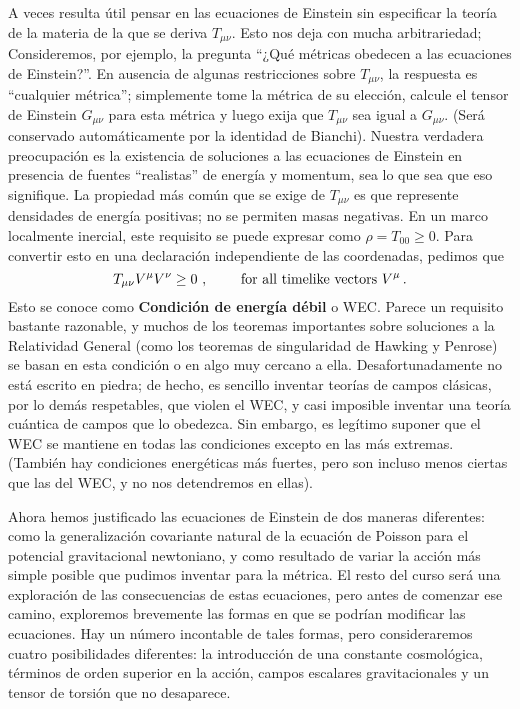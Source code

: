 \documentclass[11pt,b5paper,openany,twoside]{book}
\newcommand{\mn}{{\mu\nu}}
\begin{document}
A veces resulta útil pensar en las ecuaciones de Einstein sin especificar la teoría de la materia de la que se deriva $T_\mn$.
Esto nos deja con mucha arbitrariedad; Consideremos, por ejemplo, la pregunta ``¿Qué métricas obedecen a las ecuaciones de Einstein?''. En ausencia de algunas restricciones sobre $T_\mn$, la respuesta es ``cualquier métrica''; simplemente tome la métrica de su elección, calcule el tensor de Einstein $G_\mn$ para esta métrica y luego exija que $T_\mn$ sea igual a $G_\mn$.
(Será conservado automáticamente por la identidad de Bianchi).
Nuestra verdadera preocupación es la existencia de soluciones a las ecuaciones de Einstein en presencia de fuentes ``realistas'' de energía y momentum, sea lo que sea que eso signifique.
La propiedad más común que se exige de $T_\mn$ es que represente densidades de energía positivas; no se permiten masas negativas.
En un marco localmente inercial, este requisito se puede expresar como $\rho = T_{00} \geq 0$.
Para convertir esto en una declaración independiente de las coordenadas, pedimos que
\begin{equation}
T_\mn V^\mu V^\nu \geq 0\ ,\qquad{\rm ~for~all~timelike~vectors~}
V^\mu\,.\label{4.72}
\end{equation}
Esto se conoce como {\bf Condición de energía débil} o WEC.
Parece un requisito bastante razonable, y muchos de los teoremas importantes sobre soluciones a la Relatividad General (como los teoremas de singularidad de Hawking y Penrose) se basan en esta condición o en algo muy cercano a ella.
Desafortunadamente no está escrito en piedra; de hecho, es sencillo inventar teorías de campos clásicas, por lo demás respetables, que violen el WEC, y casi imposible inventar una teoría cuántica de campos que lo obedezca.
Sin embargo, es legítimo suponer que el WEC se mantiene en todas las condiciones excepto en las más extremas.
(También hay condiciones energéticas más fuertes, pero son incluso menos ciertas que las del WEC, y no nos detendremos en ellas).

Ahora hemos justificado las ecuaciones de Einstein de dos maneras diferentes: como la generalización covariante natural de la ecuación de Poisson para el potencial gravitacional newtoniano, y como resultado de variar la acción más simple posible que pudimos inventar para la métrica.
El resto del curso será una exploración de las consecuencias de estas ecuaciones, pero antes de comenzar ese camino, exploremos brevemente las formas en que se podrían modificar las ecuaciones.
Hay un número incontable de tales formas, pero consideraremos cuatro posibilidades diferentes: la introducción de una constante cosmológica, términos de orden superior en la acción, campos escalares gravitacionales y un tensor de torsión que no desaparece.
\end{document}
